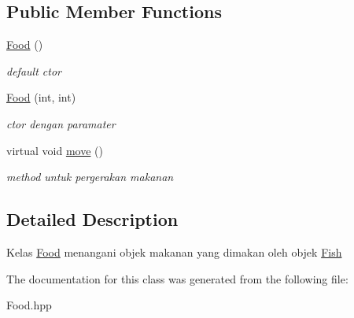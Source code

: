 \subsection*{Public Member Functions}
\begin{DoxyCompactItemize}
\item 
\mbox{\label{classFood_a75d4d7f76fd495cc8133302ca9fdc485}} 
\hyperlink{classFood_a75d4d7f76fd495cc8133302ca9fdc485}{Food} ()
\begin{DoxyCompactList}\small\item\em default ctor \end{DoxyCompactList}\item 
\mbox{\label{classFood_a342b2d30bd73b66d511aebd99ea3d0f9}} 
\hyperlink{classFood_a342b2d30bd73b66d511aebd99ea3d0f9}{Food} (int, int)
\begin{DoxyCompactList}\small\item\em ctor dengan paramater \end{DoxyCompactList}\item 
\mbox{\label{classFood_a8ab7250367a71b56cd52df3eb2eb0586}} 
virtual void \hyperlink{classFood_a8ab7250367a71b56cd52df3eb2eb0586}{move} ()
\begin{DoxyCompactList}\small\item\em method untuk pergerakan makanan \end{DoxyCompactList}\end{DoxyCompactItemize}


\subsection{Detailed Description}
Kelas \hyperlink{classFood}{Food} menangani objek makanan yang dimakan oleh objek \hyperlink{classFish}{Fish} 

The documentation for this class was generated from the following file\+:\begin{DoxyCompactItemize}
\item 
Food.\+hpp\end{DoxyCompactItemize}
